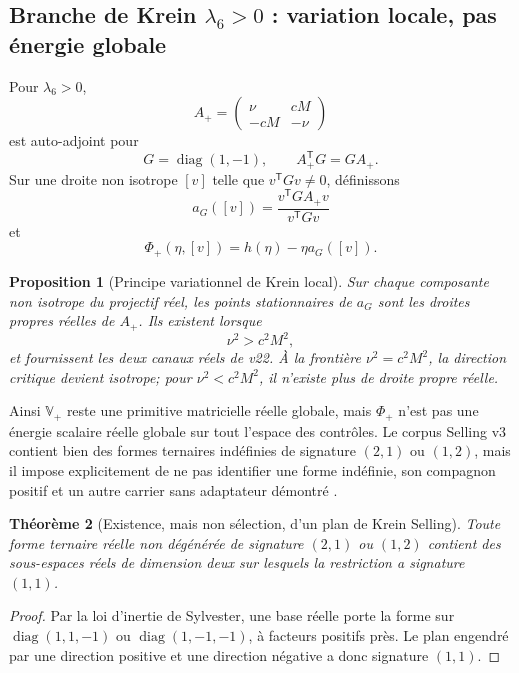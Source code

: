\documentclass[11pt,a4paper]{article}
\newtheorem{theorem}{Théorème}[section]
\newtheorem{proposition}[theorem]{Proposition}
\begin{document}
\subsection{Branche de Krein \texorpdfstring{$\lambda_6>0$}{lambda6>0} : variation locale, pas énergie globale}

Pour $\lambda_6>0$,
\[
 A_+=
 \begin{pmatrix}
 \nu&cM\\
 -cM&-\nu
 \end{pmatrix}
\]
est auto-adjoint pour
\[
 G=\operatorname{diag}(1,-1),
 \qquad A_+^{\mathsf T}G=GA_+.
\]
Sur une droite non isotrope $[v]$ telle que $v^{\mathsf T}Gv\neq0$, définissons
\[
 a_G([v])=\frac{v^{\mathsf T}GA_+v}{v^{\mathsf T}Gv}
\]
et
\begin{equation}\label{eq:v23-Phi-plus}
 \boxed{\Phi_+(\eta,[v])=h(\eta)-\eta a_G([v]).}
\end{equation}

\begin{proposition}[Principe variationnel de Krein local]\label{prop:v23-krein-local}
Sur chaque composante non isotrope du projectif réel, les points stationnaires de $a_G$ sont les droites propres réelles de $A_+$. Ils existent lorsque
\[
 \nu^2>c^2M^2,
\]
et fournissent les deux canaux réels de v22. À la frontière $\nu^2=c^2M^2$, la direction critique devient isotrope; pour $\nu^2<c^2M^2$, il n'existe plus de droite propre réelle.
\end{proposition}

Ainsi $\mathbb V_+$ reste une primitive matricielle réelle globale, mais $\Phi_+$ n'est pas une énergie scalaire réelle globale sur tout l'espace des contrôles. Le corpus Selling v3 contient bien des formes ternaires indéfinies de signature $(2,1)$ ou $(1,2)$, mais il impose explicitement de ne pas identifier une forme indéfinie, son compagnon positif et un autre carrier sans adaptateur démontré \cite{SellingHTNT}.

\begin{theorem}[Existence, mais non sélection, d'un plan de Krein Selling]\label{thm:v23-Selling-Krein-existence}
Toute forme ternaire réelle non dégénérée de signature $(2,1)$ ou $(1,2)$ contient des sous-espaces réels de dimension deux sur lesquels la restriction a signature $(1,1)$.
\end{theorem}

\begin{proof}
Par la loi d'inertie de Sylvester, une base réelle porte la forme sur $\operatorname{diag}(1,1,-1)$ ou $\operatorname{diag}(1,-1,-1)$, à facteurs positifs près. Le plan engendré par une direction positive et une direction négative a donc signature $(1,1)$.
\end{proof}
\end{document}
